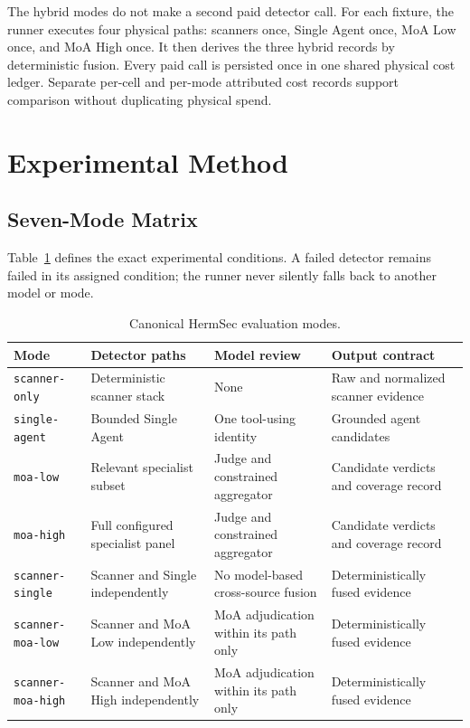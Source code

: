 \documentclass[sigconf,nonacm]{acmart}
\newcommand{\mode}[1]{\nolinkurl{#1}}
\begin{document}
The hybrid modes do not make a second paid detector call. For each fixture, the runner executes four physical paths: scanners once, Single Agent once, MoA Low once, and MoA High once. It then derives the three hybrid records by deterministic fusion. Every paid call is persisted once in one shared physical cost ledger. Separate per-cell and per-mode attributed cost records support comparison without duplicating physical spend.

\section{Experimental Method}
\label{sec:method}

\subsection{Seven-Mode Matrix}
Table~\ref{tab:modes} defines the exact experimental conditions. A failed detector remains failed in its assigned condition; the runner never silently falls back to another model or mode.

\begin{table}[t]
  \caption{Canonical HermSec evaluation modes.}
  \label{tab:modes}
  \centering
  \small
  \begin{tabular}{p{}p{}p{}p{}}
    \toprule
    Mode & Detector paths & Model review & Output contract \\
    \midrule
    \mode{scanner-only} & Deterministic scanner stack & None & Raw and normalized scanner evidence \\
    \mode{single-agent} & Bounded Single Agent & One tool-using identity & Grounded agent candidates \\
    \mode{moa-low} & Relevant specialist subset & Judge and constrained aggregator & Candidate verdicts and coverage record \\
    \mode{moa-high} & Full configured specialist panel & Judge and constrained aggregator & Candidate verdicts and coverage record \\
    \mode{scanner-single} & Scanner and Single independently & No model-based cross-source fusion & Deterministically fused evidence \\
    \mode{scanner-moa-low} & Scanner and MoA Low independently & MoA adjudication within its path only & Deterministically fused evidence \\
    \mode{scanner-moa-high} & Scanner and MoA High independently & MoA adjudication within its path only & Deterministically fused evidence \\
    \bottomrule
  \end{tabular}
\end{table}
\end{document}
